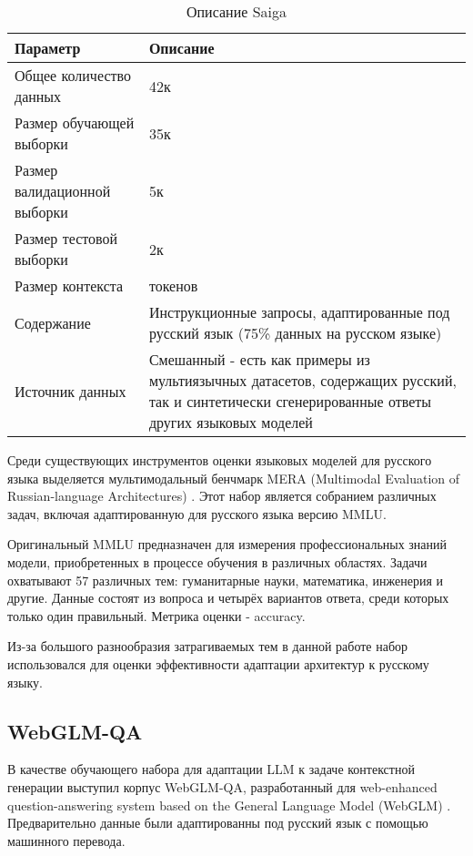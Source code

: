 \begin{table}[ht]
\centering
\caption{Описание Saiga}
\fontsize{12}{14}\selectfont
\renewcommand{\arraystretch}{1.2}
\begin{tabularx}{\textwidth}{
  >{\centering\arraybackslash}p{5cm} 
  >{\centering\arraybackslash}p{10cm}
}
\toprule
\textbf{Параметр} & \textbf{Описание} \\
\midrule
Общее количество данных & 42к \\
\midrule
Размер обучающей выборки & 35к \\
\midrule
Размер валидационной выборки & 5к \\
\midrule
Размер тестовой выборки & 2к \\
\midrule
Размер контекста & 2048 токенов \\
\midrule
Содержание & Инструкционные запросы, адаптированные под русский язык (75\% данных на русском языке) \\
\midrule
Источник данных & Смешанный - есть как примеры из мультиязычных датасетов, содержащих русский, так и синтетически сгенерированные ответы других языковых моделей \\
\bottomrule
\end{tabularx}
\end{table}

Среди существующих инструментов оценки языковых моделей для русского языка выделяется мультимодальный бенчмарк MERA (Multimodal Evaluation of Russian-language Architectures) \cite{MERA}. Этот набор является собранием различных задач, включая адаптированную для русского языка версию MMLU.

Оригинальный MMLU \cite{MMLU} предназначен для измерения профессиональных знаний модели, приобретенных в процессе обучения в различных областях. Задачи охватывают 57 различных тем: гуманитарные науки, математика, инженерия и другие. Данные состоят из вопроса и четырёх вариантов ответа, среди которых только один правильный. Метрика оценки - accuracy.

Из-за большого разнообразия затрагиваемых тем в данной работе набор использовался для оценки эффективности адаптации архитектур к русскому языку. 




\subsection{WebGLM-QA}
\label{subsec:default_webglm} 

В качестве обучающего набора для адаптации LLM к задаче контекстной генерации выступил корпус WebGLM-QA, разработанный для web-enhanced question-answering system based on the General Language Model (WebGLM) \cite{WebGLM}. Предварительно данные были адаптированны под русский язык с помощью машинного перевода.

